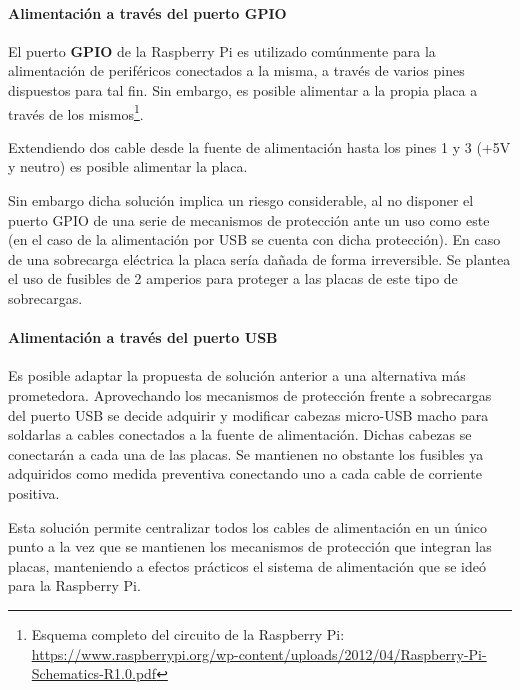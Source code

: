 \paragraph{Alimentación a través del puerto GPIO\\}

El puerto \textbf{GPIO} de la Raspberry Pi es utilizado comúnmente para la alimentación de periféricos conectados a la misma, a través de varios pines dispuestos para tal fin. Sin embargo, es posible alimentar a la propia placa a través de los mismos\footnote{Esquema completo del circuito de la Raspberry Pi: \href{https://www.raspberrypi.org/wp-content/uploads/2012/04/Raspberry-Pi-Schematics-R1.0.pdf}{https://www.raspberrypi.org/wp-content/uploads/2012/04/Raspberry-Pi-Schematics-R1.0.pdf}}.%

Extendiendo dos cable desde la fuente de alimentación hasta los pines 1 y 3 (+5V y neutro) es posible alimentar la placa.

Sin embargo dicha solución implica un riesgo considerable, al no disponer el puerto GPIO de una serie de mecanismos de protección ante un uso como este (en el caso de la alimentación por USB se cuenta con dicha protección). En caso de una sobrecarga eléctrica la placa sería dañada de forma irreversible. Se plantea el uso de fusibles de 2 amperios para proteger a las placas de este tipo de sobrecargas.

\paragraph{Alimentación a través del puerto USB\\}

Es posible adaptar la propuesta de solución anterior a una alternativa más prometedora. Aprovechando los mecanismos de protección frente a sobrecargas del puerto USB se decide adquirir y modificar cabezas micro-USB macho para soldarlas a cables conectados a la fuente de alimentación. Dichas cabezas se conectarán a cada una de las placas. Se mantienen no obstante los fusibles ya adquiridos como medida preventiva conectando uno a cada cable de corriente positiva.

Esta solución permite centralizar todos los cables de alimentación en un único punto a la vez que se mantienen los mecanismos de protección que integran las placas, manteniendo a efectos prácticos el sistema de alimentación que se ideó para la Raspberry Pi.

